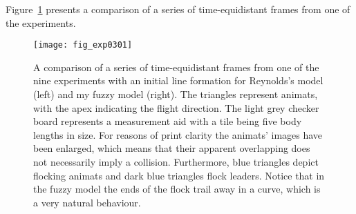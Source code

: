 Figure~\ref{fig:exp:03:01} presents a comparison of a series of time-equidistant frames from one of the experiments. 
%
\begin{figure}[!ht]
	\null\vspace*{1mm}
	\texttt{[image: fig\_exp0301]}
	\par\vspace*{1mm}
	\caption{A comparison of a series of time-equidistant frames from one of the nine experiments with an initial line formation for Reynolds's model \cite{reynolds:1999} (left) and my fuzzy model (right). The triangles represent animats, with the apex indicating the flight direction. The light grey checker board represents a measurement aid with a tile being five body lengths in size. For reasons of print clarity the animats' images have been enlarged, which means that their apparent overlapping does not necessarily imply a collision. Furthermore, blue triangles depict flocking animats and dark blue triangles flock leaders. Notice that in the fuzzy model the ends of the flock trail away in a curve, which is a very natural behaviour.}
	\label{fig:exp:03:01}
\end{figure}
%
